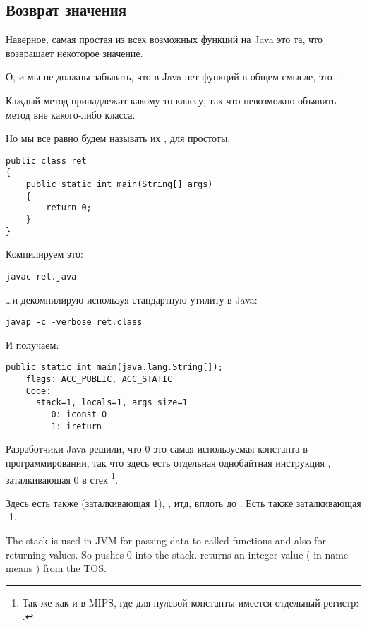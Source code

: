 \subsection{Возврат значения}

Наверное, самая простая из всех возможных функций на Java это та, что возвращает 
некоторое значение.

О, и мы не должны забывать, что в Java нет  функций в общем смысле,
это .

Каждый метод принадлежит какому-то классу, так что невозможно объявить метод 
вне какого-либо класса.

Но мы все равно будем называть их , для простоты.

\begin{lstlisting}
public class ret
{
	public static int main(String[] args) 
	{
		return 0;
	}
}
\end{lstlisting}

Компилируем это:

\begin{lstlisting}
javac ret.java
\end{lstlisting}

\dots и декомпилирую используя стандартную утилиту в Java:

\begin{lstlisting}
javap -c -verbose ret.class
\end{lstlisting}

И получаем:

\begin{lstlisting}[caption=JDK 1.7 (excerpt)]
  public static int main(java.lang.String[]);
    flags: ACC_PUBLIC, ACC_STATIC
    Code:
      stack=1, locals=1, args_size=1
         0: iconst_0      
         1: ireturn       
\end{lstlisting}

Разработчики Java решили, что 0 это самая используемая константа в программировании,
так что здесь есть отдельная однобайтная инструкция , заталкивающая 0 в стек
\footnote{Так же как и в MIPS, где для нулевой константы имеется отдельный регистр: .}.

Здесь есть также  (заталкивающая 1), , итд, 
вплоть до .
Есть также  заталкивающая -1.

The stack is used in JVM for passing data to called functions and also for returning values.
So  pushes 0 into the stack.
 returns an integer value ( in name means ) from the \ac{TOS}.

